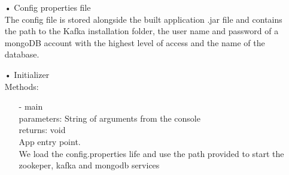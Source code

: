 \documentclass[oneside, english, final]{design}
\begin{document}
\begin{itemize}

	\item[•] Config properties file
	      \\The config file is stored alongside the built application .jar file and contains the path to the Kafka installation folder, the user name and password of a mongoDB account with the highest level of access and the name of the database.

	\item[•]Initializer
	      \\Methods:
	      \begin{itemize}
		      \item[-]main
		            \\ parameters: String of arguments from the console
		            \\ returns: void
		            \\ App entry point.
		            \\ We load the config.properties life and use the path provided to start the zookeper, kafka and mongodb services
	      \end{itemize}



\end{itemize}
\end{document}
